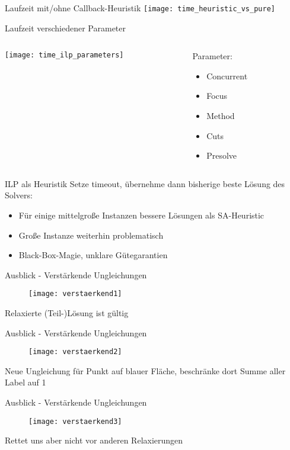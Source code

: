 \documentclass[ngerman,aspectratio=169,10pt]{beamer}
\begin{document}
\begin{frame}{Laufzeit mit/ohne Callback-Heuristik}
    \centering
    \texttt{[image: time\_heuristic\_vs\_pure]}
\end{frame}

\begin{frame}{Laufzeit verschiedener Parameter}
    \centering
    \begin{columns}
        \begin{column}{0.6\linewidth}
            \vspace{10px}
            \texttt{[image: time\_ilp\_parameters]}
        \end{column}
        \begin{column}{0.2\linewidth}
            Parameter:
            \begin{itemize}
                \item Concurrent
                \item Focus
                \item Method
                \item Cuts
                \item Presolve
            \end{itemize}
        \end{column}
    \end{columns}
\end{frame}

\begin{frame}{ILP als Heuristik}
    Setze timeout, übernehme dann bisherige beste Lösung des Solvers:
    \begin{itemize}
        \item Für einige mittelgroße Instanzen bessere Lösungen als SA-Heuristic
        \item Große Instanze weiterhin problematisch
        \item Black-Box-Magie, unklare Gütegarantien
    \end{itemize}
\end{frame}

\begin{frame}{Ausblick - Verstärkende Ungleichungen}
    \begin{figure}
        \texttt{[image: verstaerkend1]}
    \end{figure}
    Relaxierte (Teil-)Lösung ist gültig
\end{frame}

\begin{frame}{Ausblick - Verstärkende Ungleichungen}
    \begin{figure}
        \texttt{[image: verstaerkend2]}
    \end{figure}
    Neue Ungleichung für Punkt auf blauer Fläche, beschränke dort Summe aller Label auf 1
\end{frame}

\begin{frame}{Ausblick - Verstärkende Ungleichungen}
    \begin{figure}
        \texttt{[image: verstaerkend3]}
    \end{figure}
    Rettet uns aber nicht vor anderen Relaxierungen
\end{frame}
\end{document}

